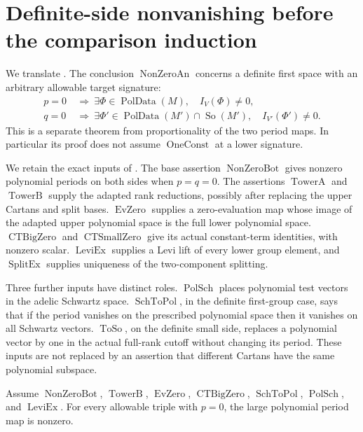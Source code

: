 
\section{Definite-side nonvanishing before the comparison induction}
\label{sec:sr-source-definite-nonzero}

We translate .
The conclusion \(\operatorname{NonZeroAn}\) concerns a definite
first space with an arbitrary allowable target signature:
\[
 \begin{split}
 p=0&\ \Longrightarrow\
    \exists\Phi\in\operatorname{PolData}(M),\quad I_V(\Phi)\ne0,\\
 q=0&\ \Longrightarrow\
    \exists\Phi'\in\operatorname{PolData}(M')\cap\operatorname{So}(M'),
                          \quad I_{V'}(\Phi')\ne0 .
 \end{split}                                      \tag{N1}
 \label{eq:sr-source-nonzeroAn}
\]
This is a separate theorem from proportionality of the two period
maps. In particular its proof does not assume \(\operatorname{OneConst}\)
at a lower signature.

We retain the exact inputs of .
The base assertion \(\operatorname{NonZeroBot}\) gives nonzero
polynomial periods on both sides when \(p=q=0\).
The assertions \(\operatorname{TowerA}\) and
\(\operatorname{TowerB}\) supply the adapted rank reductions,
possibly after replacing the upper Cartans and split bases.
\(\operatorname{EvZero}\) supplies a zero-evaluation map whose
image of the adapted upper polynomial space is the full lower
polynomial space.
\(\operatorname{CTBigZero}\) and
\(\operatorname{CTSmallZero}\) give its actual constant-term
identities, with nonzero scalar.
\(\operatorname{LeviEx}\) supplies a Levi lift of every lower
group element, and \(\operatorname{SplitEx}\) supplies uniqueness
of the two-component splitting.

Three further inputs have distinct roles.
\(\operatorname{PolSch}\) places polynomial test vectors in
the adelic Schwartz space.
\(\operatorname{SchToPol}\), in the definite first-group case,
says that if the period vanishes on the prescribed polynomial
space then it vanishes on all Schwartz vectors.
\(\operatorname{ToSo}\), on the definite small side, replaces
a polynomial vector by one in the actual full-rank cutoff
without changing its period.
These inputs are not replaced by an assertion that different
Cartans have the same polynomial subspace.

\begin{srlemma}
\label{lem:sr-source-big-nonzero}
Assume \(\operatorname{NonZeroBot}\),
\(\operatorname{TowerB}\), \(\operatorname{EvZero}\),
\(\operatorname{CTBigZero}\), \(\operatorname{SchToPol}\),
\(\operatorname{PolSch}\), and \(\operatorname{LeviEx}\).
For every allowable triple with \(p=0\), the large polynomial
period map is nonzero.
\end{srlemma}

